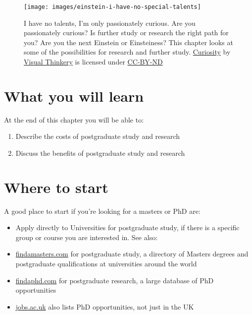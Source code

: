 \documentclass[
]{book}
\providecommand{\tightlist}{%
  \setlength{\itemsep}{0pt}\setlength{\parskip}{0pt}}
\begin{document}
\begin{figure}

{\centering \texttt{[image: images/einstein-i-have-no-special-talents]} 

}

\caption{I have no talents, I'm only passionately curious. Are you passionately curious? Is further study or research the right path for you? Are you the next Einstein or Einsteiness? This chapter looks at some of the possibilities for research and further study. \href{https://bryanmmathers.com/curiosity/}{Curiosity} by \href{https://visualthinkery.com/}{Visual Thinkery} is licensed under \href{https://creativecommons.org/licenses/by-nd/4.0/}{CC-BY-ND}}\label{fig:einstein-fig}
\end{figure}



\hypertarget{ilo12}{%
\section{What you will learn}\label{ilo12}}

At the end of this chapter you will be able to:

\begin{enumerate}
\def\labelenumi{\arabic{enumi}.}
\tightlist
\item
  Describe the costs of postgraduate study and research
\item
  Discuss the benefits of postgraduate study and research
\end{enumerate}

\hypertarget{finda}{%
\section{Where to start}\label{finda}}

A good place to start if you're looking for a masters or PhD are:

\begin{itemize}
\tightlist
\item
  Apply directly to Universities for postgraduate study, if there is a specific group or course you are interested in. See also:
\item
  \href{https://www.findamasters.com/}{findamasters.com} for postgraduate study, a directory of Masters degrees and postgraduate qualifications at universities around the world
\item
  \href{https://www.findaphd.com/}{findaphd.com} for postgraduate research, a large database of PhD opportunities
\item
  \href{https://www.jobs.ac.uk/}{jobs.ac.uk} also lists PhD opportunities, not just in the UK
\end{itemize}
\end{document}
